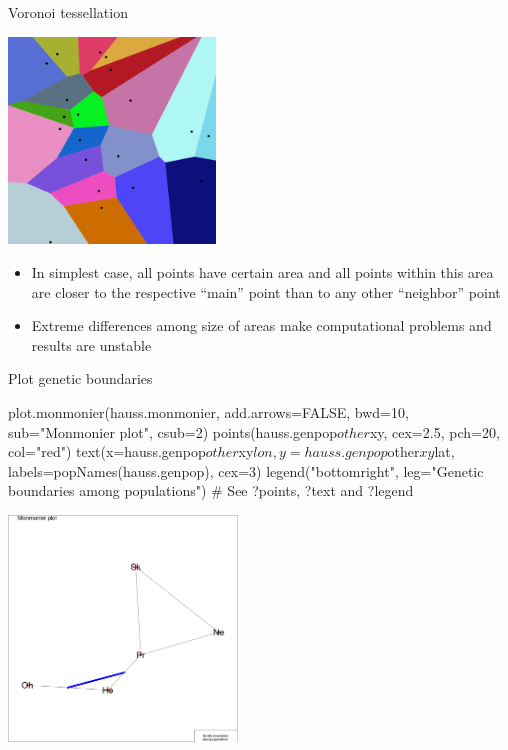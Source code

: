 \documentclass[compress, ucs, xelatex, 11pt, xcolor=svgnames,
  hyperref={
    bookmarks=true,
    unicode=true,
    colorlinks=true,
    pdftitle={Molecular data in R},
    plainpages=false,
    pdfauthor={Vojtech Zeisek},
    pdfsubject={Course about phylogeny and evolution in R},
    pdfcreator={XeLaTeX},
    pdfkeywords={R, evolution, phylogeny, molecular data},
    linkcolor=Tomato,
    anchorcolor=SaddleBrown,
    citecolor=Goldenrod,
    filecolor=DarkMagenta,
    menucolor=Sienna,
    urlcolor=DarkTurquoise,
    pdftex},
  url={hyphens, lowtilde} %
  ]{beamer}
\begin{document}
\begin{frame}{Voronoi tessellation}
  \begin{multicols}{2}
    \includegraphics[height=5.5cm]{voronoi_diagram.png}
    \begin{itemize}
      \item In simplest case, all points have certain area and all points within this area are closer to the respective ``main'' point than to any other ``neighbor'' point
      \item Extreme differences among size of areas make computational problems and results are unstable
    \end{itemize}
  \end{multicols}
\end{frame}

\begin{frame}[fragile]{Plot genetic boundaries}
\begin{multicols}{2}
  \begin{spluscode}
    plot.monmonier(hauss.monmonier,
      add.arrows=FALSE, bwd=10,
      sub="Monmonier plot", csub=2)
    points(hauss.genpop$other$xy,
      cex=2.5, pch=20, col="red")
    text(x=hauss.genpop$other$xy$lon,
      y=hauss.genpop$other$xy$lat,
      labels=popNames(hauss.genpop),
      cex=3)
    legend("bottomright",
      leg="Genetic boundaries\n
      among populations")
    # See ?points, ?text and ?legend
  \end{spluscode}
  \includegraphics[height=6cm]{monmonier.png}
\end{multicols}
\end{frame}
\end{document}
